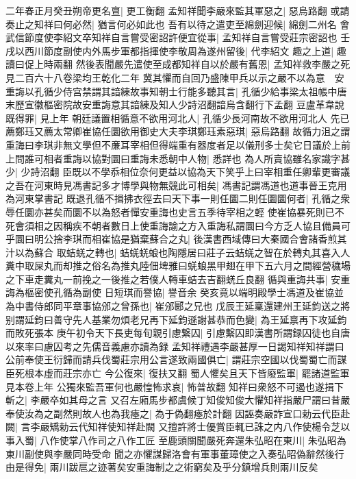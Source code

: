 二年春正月癸丑朔帝更名亶|{
	更工衡翻}
孟知祥聞李嚴來監其軍惡之|{
	惡烏路翻}
或請奏止之知祥曰何必然|{
	猶言何必如此也}
吾有以待之遣吏至綿劍迎候|{
	綿劍二州名}
會武信節度使李紹文卒知祥自言嘗受密詔許便宜從事|{
	孟知祥自言嘗受莊宗密詔也}
壬戌以西川節度副使内外馬步軍都指揮使李敬周為遂州留後|{
	代李紹文}
趣之上道|{
	趣讀曰促上時兩翻}
然後表聞嚴先遣使至成都知祥自以於嚴有舊恩|{
	孟知祥救李嚴之死見二百六十八卷梁均王乾化二年}
冀其懼而自回乃盛陳甲兵以示之嚴不以為意　安重誨以孔循少侍宫禁謂其諳練故事知朝士行能多聽其言|{
	孔循少給事梁太祖帳中唐末歷宣徽樞密院故安重誨意其諳練及知人少詩沼翻諳烏含翻行下孟翻}
豆盧革韋說既得罪|{
	見上年}
朝廷議置相循意不欲用河北人|{
	孔循少長河南故不欲用河北人}
先已薦鄭珏又薦太常卿崔協任圜欲用御史大夫李琪鄭珏素惡琪|{
	惡烏路翻}
故循力沮之謂重誨曰李琪非無文學但不亷耳宰相但得端重有器度者足以儀刑多士矣它日議於上前上問誰可相者重誨以協對圜曰重誨未悉朝中人物|{
	悉詳也}
為人所賣協雖名家識字甚少|{
	少詩沼翻}
臣既以不學忝相位奈何更益以協為天下笑乎上曰宰相重任卿輩更審議之吾在河東時見馮書記多才博學與物無競此可相矣|{
	馮書記謂馮道也道事晉王克用為河東掌書記}
既退孔循不揖拂衣徑去曰天下事一則任圜二則任圜圜何者|{
	孔循之衆辱任圜亦甚矣而圜不以為怒者憚安重誨也史言五季待宰相之輕}
使崔協暴死則已不死會須相之因稱疾不朝者數日上使重誨諭之方入重誨私謂圜曰今方乏人協且備員可乎圜曰明公捨李琪而相崔協是猶棄蘇合之丸|{
	後漢書西域傳曰大秦國合會諸香煎其汁以為蘇合}
取蛣蜣之轉也|{
	蛣蜣蜣蜋也陶隱居曰莊子云蛣蜣之智在於轉丸其喜入人糞中取屎丸而却推之俗名為推丸陸佃埤雅曰蜣蜋黑甲翅在甲下五六月之間經營穢場之下車走糞丸一前挽之一後推之若僕人轉車蛣去吉翻蜣丘良翻}
循與重誨共事|{
	安重誨為樞密使孔循為副使}
日短琪而譽協|{
	譽音余}
癸亥竟以端明殿學士馮道及崔協並為中書侍郎同平章事協邠之曾孫也|{
	崔邠郾之兄也}
戊辰王延稟還建州王延鈞送之將别謂延鈞曰善守先人基業勿煩老兄再下延鈞遜謝甚恭而色變|{
	為王延禀再下攻延鈞而敗死張本}
庚午初令天下長吏每旬親引慮繋囚|{
	引慮繫囚即漢書所謂録囚徒也自唐以來率曰慮囚考之先儒音義慮亦讀為録}
孟知祥禮遇李嚴甚厚一日謁知祥知祥謂曰公前奉使王衍歸而請兵伐蜀莊宗用公言遂致兩國俱亡|{
	謂莊宗空國以伐蜀蜀亡而謀臣死根本虛而莊宗亦亡}
今公復來|{
	復扶又翻}
蜀人懼矣且天下皆廢監軍|{
	罷諸道監軍見本卷上年}
公獨來監吾軍何也嚴惶怖求哀|{
	怖普故翻}
知祥曰衆怒不可遏也遂揖下斬之|{
	李嚴卒如其母之言}
又召左廂馬步都虞候丁知俊知俊大懼知祥指嚴尸謂曰昔嚴奉使汝為之副然則故人也為我瘞之|{
	為于偽翻瘞於計翻}
因誣奏嚴詐宣口勅云代臣赴闕|{
	言李嚴矯勅云代知祥使知祥赴闕}
又擅許將士優賞臣輒已誅之内八作使楊令芝以事入蜀|{
	八作使掌八作司之八作工匠}
至鹿頭關聞嚴死奔還朱弘昭在東川|{
	朱弘昭為東川副使與李嚴同時受命}
聞之亦懼謀歸洛會有軍事董璋使之入奏弘昭偽辭然後行由是得免|{
	兩川跋扈之迹著矣安重誨制之之術窮矣及乎分鎮增兵則兩川反矣}
